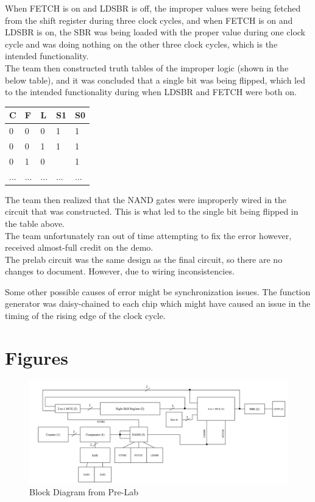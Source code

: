 \documentclass[journal, twocolumn, final,11pt,letterpaper]{IEEEtran}
\begin{document}
When FETCH is on and LDSBR is off, the improper values were being fetched from the shift register during three clock cycles, and when FETCH is on and LDSBR is on, the SBR was being loaded with the proper value during one clock cycle and was doing nothing on the other three clock cycles, which is the intended functionality.\\

The team then constructed truth tables of the improper logic (shown in the below table), and it was concluded that a single bit was being flipped, which led to the intended functionality during when LDSBR and FETCH were both on.

\begin{center}
	\begin{tabular}{lll|ll}
		C & F & L & S1 & S0 \\ \hline
		0 & 0 & 0 & 1 & 1\\
		0 & 0 & 1 & 1 & 1 \\
		0 & 1 & 0 & \hspace{-2mm}\circled[red]0 & 1 \\
		... & ... & ...& ... & ... \\
		
		
	\end{tabular}
\end{center}

The team then realized that the NAND gates were improperly wired in the circuit that was constructed. This is what led to the single bit being flipped in the table above. \\

The team unfortunately ran out of time attempting to fix the error however, received almost-full credit on the demo. \\

The prelab circuit was the same design as the final circuit, so there are no changes to document. However, due to wiring inconsistencies.

Some other possible causes of error might be synchronization issues. The function generator was daisy-chained to each chip which might have caused an issue in the timing of the rising edge of the clock cycle. \\

\newpage
\onecolumn
\section{Figures}
\begin{figure}[h]
	\centering
	\includegraphics[scale=0.55]{Block_Diagram.png}
	\caption{Block Diagram from Pre-Lab}
	\label{fig:block-diagram}
\end{figure}
\end{document}
